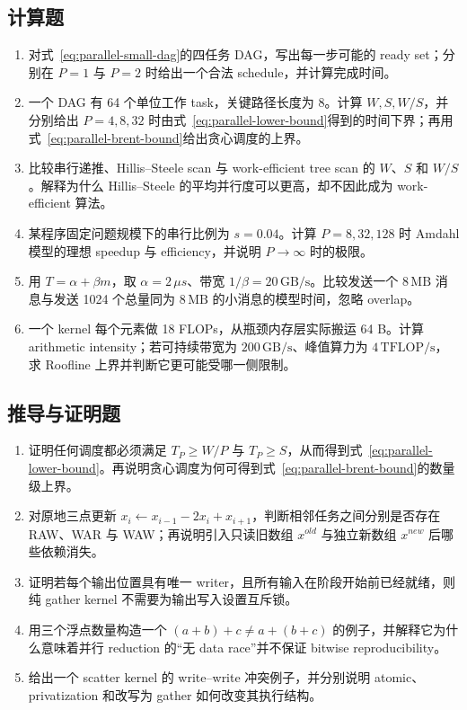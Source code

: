 \subsection*{计算题}
\begin{enumerate}[label=\arabic*.]
\item 对式~\eqref{eq:parallel-small-dag}的四任务 DAG，写出每一步可能的 ready set；分别在 $P=1$ 与 $P=2$ 时给出一个合法 schedule，并计算完成时间。
\item 一个 DAG 有 64 个单位工作 task，关键路径长度为 8。计算 $W,S,W/S$，并分别给出 $P=4,8,32$ 时由式~\eqref{eq:parallel-lower-bound}得到的时间下界；再用式~\eqref{eq:parallel-brent-bound}给出贪心调度的上界。
\item 比较串行递推、Hillis--Steele scan 与 work-efficient tree scan 的 $W$、$S$ 和 $W/S$。解释为什么 Hillis--Steele 的平均并行度可以更高，却不因此成为 work-efficient 算法。
\item 某程序固定问题规模下的串行比例为 $s=0.04$。计算 $P=8,32,128$ 时 Amdahl 模型的理想 speedup 与 efficiency，并说明 $P\rightarrow\infty$ 时的极限。
\item 用 $T=\alpha+\beta m$，取 $\alpha=2\,\mu s$、带宽 $1/\beta=20\,\mathrm{GB/s}$。比较发送一个 $8\,\mathrm{MB}$ 消息与发送 1024 个总量同为 $8\,\mathrm{MB}$ 的小消息的模型时间，忽略 overlap。
\item 一个 kernel 每个元素做 18 FLOPs，从瓶颈内存层实际搬运 64 B。计算 arithmetic intensity；若可持续带宽为 $200\,\mathrm{GB/s}$、峰值算力为 $4\,\mathrm{TFLOP/s}$，求 Roofline 上界并判断它更可能受哪一侧限制。
\end{enumerate}

\subsection*{推导与证明题}
\begin{enumerate}[label=\arabic*.]
\item 证明任何调度都必须满足 $T_P\ge W/P$ 与 $T_P\ge S$，从而得到式~\eqref{eq:parallel-lower-bound}。再说明贪心调度为何可得到式~\eqref{eq:parallel-brent-bound}的数量级上界。
\item 对原地三点更新 $x_i\leftarrow x_{i-1}-2x_i+x_{i+1}$，判断相邻任务之间分别是否存在 RAW、WAR 与 WAW；再说明引入只读旧数组 $x^{old}$ 与独立新数组 $x^{new}$ 后哪些依赖消失。
\item 证明若每个输出位置具有唯一 writer，且所有输入在阶段开始前已经就绪，则纯 gather kernel 不需要为输出写入设置互斥锁。
\item 用三个浮点数量构造一个 $(a+b)+c\neq a+(b+c)$ 的例子，并解释它为什么意味着并行 reduction 的“无 data race”并不保证 bitwise reproducibility。
\item 给出一个 scatter kernel 的 write--write 冲突例子，并分别说明 atomic、privatization 和改写为 gather 如何改变其执行结构。
\end{enumerate}

